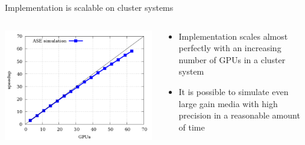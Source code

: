 \autobookmark
\begin{frame}{Implementation is scalable on cluster systems}
  \begin{columns}

    \begin{column}{.5\textwidth}
        \includegraphics[width=.5\paperwidth]{graphics/scaling.png}
      \end{column}

      \begin{column}{.5\textwidth}
        \begin{itemize}
            \item Implementation scales almost perfectly with an increasing
              number of GPUs in a cluster system
            \item It is possible to simulate even large gain media with high
              precision in a reasonable amount of time
        \end{itemize}
      \end{column}

    \end{columns}
\end{frame}

